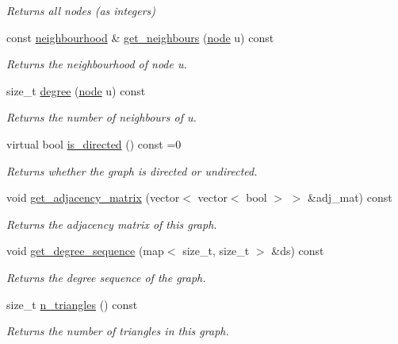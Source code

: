 \begin{DoxyCompactItemize}
\begin{DoxyCompactList}\small\item\em Returns all nodes (as integers) \end{DoxyCompactList}\item 
const \hyperlink{namespacelgraph_1_1utils_a0f2ef47028a466d26841709e705390ac}{neighbourhood} \& \hyperlink{classlgraph_1_1utils_1_1xxgraph_a2c5332c4663c2d52828893f095a68202}{get\+\_\+neighbours} (\hyperlink{namespacelgraph_1_1utils_a7bd66ede3805ef121bc2835bd48de0cf}{node} u) const 
\begin{DoxyCompactList}\small\item\em Returns the neighbourhood of node u. \end{DoxyCompactList}\item 
size\+\_\+t \hyperlink{classlgraph_1_1utils_1_1xxgraph_af588aa4c68004a31aa143024cdb6dcc9}{degree} (\hyperlink{namespacelgraph_1_1utils_a7bd66ede3805ef121bc2835bd48de0cf}{node} u) const 
\begin{DoxyCompactList}\small\item\em Returns the number of neighbours of u. \end{DoxyCompactList}\item 
virtual bool \hyperlink{classlgraph_1_1utils_1_1xxgraph_a154376b6e55c4654622eb17ce738b5bb}{is\+\_\+directed} () const =0
\begin{DoxyCompactList}\small\item\em Returns whether the graph is directed or undirected. \end{DoxyCompactList}\item 
void \hyperlink{classlgraph_1_1utils_1_1xxgraph_a401454762f6b4b69f13ab0a10729c457}{get\+\_\+adjacency\+\_\+matrix} (vector$<$ vector$<$ bool $>$ $>$ \&adj\+\_\+mat) const \hypertarget{classlgraph_1_1utils_1_1xxgraph_a401454762f6b4b69f13ab0a10729c457}{}\label{classlgraph_1_1utils_1_1xxgraph_a401454762f6b4b69f13ab0a10729c457}

\begin{DoxyCompactList}\small\item\em Returns the adjacency matrix of this graph. \end{DoxyCompactList}\item 
void \hyperlink{classlgraph_1_1utils_1_1xxgraph_aff73f5ac4cd2732caa0c528eb1c1833c}{get\+\_\+degree\+\_\+sequence} (map$<$ size\+\_\+t, size\+\_\+t $>$ \&ds) const 
\begin{DoxyCompactList}\small\item\em Returns the degree sequence of the graph. \end{DoxyCompactList}\item 
size\+\_\+t \hyperlink{classlgraph_1_1utils_1_1xxgraph_ad4f25a8b29c6f26bc1567cb9c5a564ba}{n\+\_\+triangles} () const 
\begin{DoxyCompactList}\small\item\em Returns the number of triangles in this graph. \end{DoxyCompactList}\end{DoxyCompactItemize}
